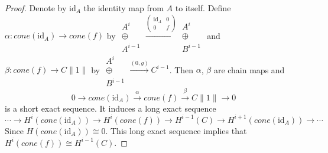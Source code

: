 \documentclass{amsart}
\theoremstyle{plain}
\theoremstyle{definition}
\theoremstyle{remark}
\numberwithin{equation}{section}
\begin{document}
\begin{proof}
Denote by ${\mathrm{id}}_A$ the identity map from $A$ to itself. Define $\alpha:cone({\mathrm{id}}_A)\rightarrow cone(f)$ by $\left.\begin{array}{c}
  A^i \\
  \oplus \\
  A^{i-1}
\end{array}\right.
\xrightarrow{\left(\begin{array}{cc}
  {\mathrm{id}}_A & 0 \\
  0 & f
\end{array}\right)}
\left.\begin{array}{c}
  A^{i} \\
  \oplus \\
  B^{i-1}
\end{array}\right.$
and $\beta:cone(f) \rightarrow C\|1\|$ by 
$\left.\begin{array}{c}
  A^{i} \\
  \oplus \\
  B^{i-1}
\end{array}\right.
\xrightarrow{(0,g)}
C^{i-1}$.
Then $\alpha$, $\beta$ are chain maps and 
\[
0 \rightarrow cone({\mathrm{id}}_A) \xrightarrow{\alpha} cone(f) \xrightarrow{\beta} C\|1\| \rightarrow 0
\]
is a short exact sequence. It induces a long exact sequence
\[
\cdots \rightarrow H^i(cone({\mathrm{id}}_A)) \rightarrow H^i(cone(f)) \rightarrow H^{i-1}(C) \rightarrow H^{i+1}(cone({\mathrm{id}}_A)) \rightarrow \cdots
\]
Since $H(cone({\mathrm{id}}_A)) \cong 0$. This long exact sequence implies that $H^i(cone(f)) \cong H^{i-1}(C)$.


\end{proof}
\end{document}
